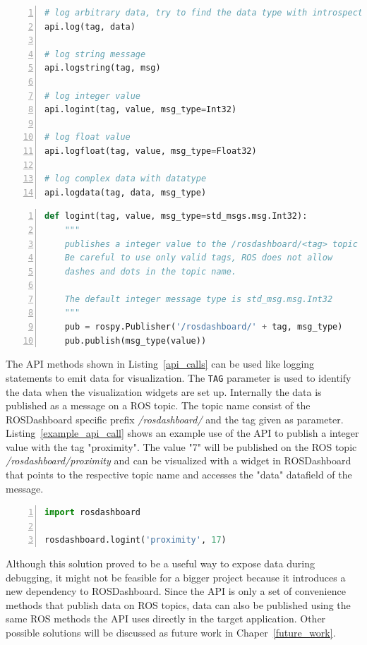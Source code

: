 \begin{lstlisting}[frame=single,caption={ROSDashboard API methods.},label=api_calls,language=Python,numbers=left,breaklines=true]
# log arbitrary data, try to find the data type with introspection
api.log(tag, data)

# log string message
api.logstring(tag, msg)

# log integer value
api.logint(tag, value, msg_type=Int32)

# log float value
api.logfloat(tag, value, msg_type=Float32)

# log complex data with datatype
api.logdata(tag, data, msg_type)
\end{lstlisting}

\begin{lstlisting}[frame=single,caption={Implemented logint API method.},label=api_implementation,language=Python,numbers=left,breaklines=true]
def logint(tag, value, msg_type=std_msgs.msg.Int32):
    """
    publishes a integer value to the /rosdashboard/<tag> topic
    Be careful to use only valid tags, ROS does not allow
    dashes and dots in the topic name.
    
    The default integer message type is std_msg.msg.Int32
    """
    pub = rospy.Publisher('/rosdashboard/' + tag, msg_type)
    pub.publish(msg_type(value))
\end{lstlisting}

The API methods shown in Listing~\ref{api_calls} can be used like logging statements to emit data for visualization. The \verb+TAG+ parameter is used to identify the data when the visualization widgets are set up. Internally the data is published as a message on a ROS topic. The topic name consist of the ROSDashboard specific prefix \emph{/rosdashboard/} and the tag given as parameter. Listing~\ref{example_api_call} shows an example use of the API to publish a integer value with the tag "proximity". The value "7" will be published on the ROS topic \emph{/rosdashboard/proximity} and can be visualized with a widget in ROSDashboard that points to the respective topic name and accesses the "data" datafield of the message.

\begin{lstlisting}[frame=single,caption={Example API usage.},label=example_api_call,language=Python,numbers=left,breaklines=true]
import rosdashboard

rosdashboard.logint('proximity', 17)
\end{lstlisting}

Although this solution proved to be a useful way to expose data during debugging, it might not be feasible for a bigger project because it introduces a new dependency to ROSDashboard. Since the API is only a set of convenience methods that publish data on ROS topics, data can also be published using the same ROS methods the API uses directly in the target application. Other possible solutions will be discussed as future work in Chaper~\ref{future_work}.
